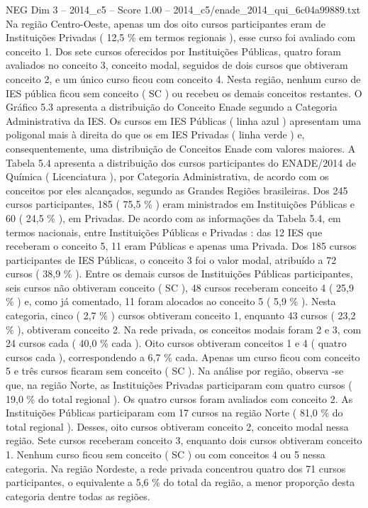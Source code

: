 \begin{textsample}{NEG Dim 3 – 2014\_c5 – Score 1.00 – 2014\_c5/enade\_2014\_qui\_6c04a99889.txt}
Na região Centro-Oeste, apenas um dos oito cursos participantes eram de Instituições Privadas ( 12,5 \% em termos regionais ), esse curso foi avaliado com conceito 1.
Dos sete cursos oferecidos por Instituições Públicas, quatro foram avaliados no conceito 3, conceito modal, seguidos de dois cursos que obtiveram conceito 2, e um único curso ficou com conceito 4.
Nesta região, nenhum curso de IES pública ficou sem conceito ( SC ) ou recebeu os demais conceitos restantes.
O Gráfico 5.3 apresenta a distribuição do Conceito Enade segundo a Categoria Administrativa da IES.
Os cursos em IES Públicas ( linha azul ) apresentam uma poligonal mais à direita do que os em IES Privadas ( linha verde ) e, consequentemente, uma distribuição de Conceitos Enade com valores maiores.
A Tabela 5.4 apresenta a distribuição dos cursos participantes do ENADE/2014 de Química ( Licenciatura ), por Categoria Administrativa, de acordo com os conceitos por eles alcançados, segundo as Grandes Regiões brasileiras.
Dos 245 cursos participantes, 185 ( 75,5 \% ) eram ministrados em Instituições Públicas e 60 ( 24,5 \% ), em Privadas.
De acordo com as informações da Tabela 5.4, em termos nacionais, entre Instituições Públicas e Privadas : das 12 IES que receberam o conceito 5, 11 eram Públicas e apenas uma Privada.
Dos 185 cursos participantes de IES Públicas, o conceito 3 foi o valor modal, atribuído a 72 cursos ( 38,9 \% ).
Entre os demais cursos de Instituições Públicas participantes, seis cursos não obtiveram conceito ( SC ), 48 cursos receberam conceito 4 ( 25,9 \% ) e, como já comentado, 11 foram alocados ao conceito 5 ( 5,9 \% ).
Nesta categoria, cinco ( 2,7 \% ) cursos obtiveram conceito 1, enquanto 43 cursos ( 23,2 \% ), obtiveram conceito 2.
Na rede privada, os conceitos modais foram 2 e 3, com 24 cursos cada ( 40,0 \% cada ).
Oito cursos obtiveram conceitos 1 e 4 ( quatro cursos cada ), correspondendo a 6,7 \% cada.
Apenas um curso ficou com conceito 5 e três cursos ficaram sem conceito ( SC ).
Na análise por região, observa -se que, na região Norte, as Instituições Privadas participaram com quatro cursos ( 19,0 \% do total regional ).
Os quatro cursos foram avaliados com conceito 2.
As Instituições Públicas participaram com 17 cursos na região Norte ( 81,0 \% do total regional ).
Desses, oito cursos obtiveram conceito 2, conceito modal nessa região.
Sete cursos receberam conceito 3, enquanto dois cursos obtiveram conceito 1.
Nenhum curso ficou sem conceito ( SC ) ou com conceitos 4 ou 5 nessa categoria.
Na região Nordeste, a rede privada concentrou quatro dos 71 cursos participantes, o equivalente a 5,6 \% do total da região, a menor proporção desta categoria dentre todas as regiões.

\end{textsample}
